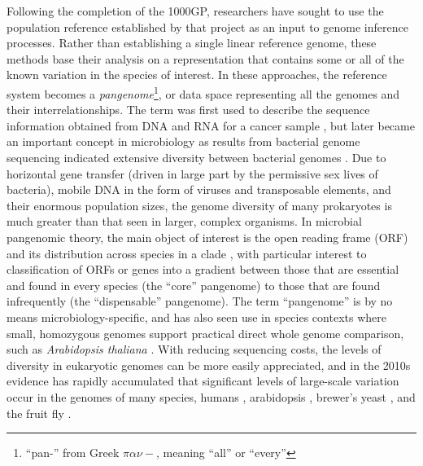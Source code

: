 Following the completion of the 1000GP, researchers have sought to use the population reference established by that project as an input to genome inference processes.
Rather than establishing a single linear reference genome, these methods base their analysis on a representation that contains some or all of the known variation in the species of interest.
In these approaches, the reference system becomes a \emph{pangenome}\footnote{``pan-'' from Greek $\pi\alpha\nu-$, meaning ``all'' or ``every''}, or data space representing all the genomes and their interrelationships.
The term was first used to describe the sequence information obtained from DNA and RNA for a cancer sample \cite{sigaux2000cancer}, but later became an important concept in microbiology as results from bacterial genome sequencing indicated extensive diversity between bacterial genomes \cite{tettelin2005genome,medini2005microbial}.
Due to horizontal gene transfer (driven in large part by the permissive sex lives of bacteria), mobile DNA in the form of viruses and transposable elements, and their enormous population sizes, the genome diversity of many prokaryotes is much greater than that seen in larger, complex organisms.
In microbial pangenomic theory, the main object of interest is the open reading frame (ORF) and its distribution across species in a clade \cite{vernikos2015ten}, with particular interest to classification of ORFs or genes into a gradient between those that are essential and found in every species (the ``core'' pangenome) to those that are found infrequently (the ``dispensable'' pangenome).
The term ``pangenome'' is by no means microbiology-specific, and has also seen use in species contexts where small, homozygous genomes support practical direct whole genome comparison, such as \emph{Arabidopsis thaliana} \cite{cao2011whole}.
With reducing sequencing costs, the levels of diversity in eukaryotic genomes can be more easily appreciated, and in the 2010s evidence has rapidly accumulated that significant levels of large-scale variation occur in the genomes of many species, humans \cite{li2010building,sudmant2010,sudmant2015integrated,chaisson2018multi}, arabidopsis \cite{alonso2016arabidopsis}, brewer's yeast \cite{yue2017contrasting}, and the fruit fly \cite{chakraborty2018hidden}.

